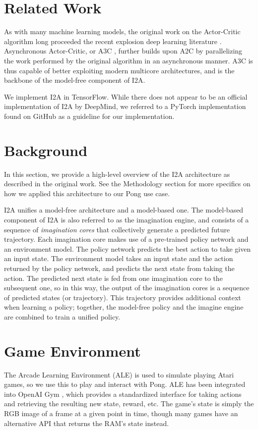 \documentclass[10pt, twocolumn]{article}
\begin{document}
\section{Related Work}
As with many machine learning models, the original work on the Actor-Critic algorithm long proceeded the recent explosion deep learning literature \cite{A2C}. Asynchronous Actor-Critic, or A3C \cite{A3C}, further builds upon A2C by parallelizing the work performed by the original algorithm in an asynchronous manner. A3C is thus capable of better exploiting modern multicore architectures, and is the backbone of the model-free component of I2A.

We implement I2A in TensorFlow. While there does not appear to be an official implementation of I2A by DeepMind, we referred to a PyTorch implementation found on GitHub \cite{} as a guideline for our implementation.

\section{Background}

In this section, we provide a high-level overview of the I2A architecture as described in the original work. See the Methodology section for more specifics on how we applied this architecture to our Pong use case.

I2A unifies a model-free 
architecture and a model-based one. The model-based component of I2A is also referred to as the imagination engine, and consists of a 
sequence of \emph{imagination cores} that collectively generate a predicted future trajectory. Each imagination core makes use of a pre-trained policy network and an environment model. The policy network predicts the best action to take given an input state. The environment model takes an input state and the action returned by the policy network, and predicts the next state from taking the action. The predicted next state is fed from one imagination core to the subsequent one, so in this way, the output of the imagination cores is a sequence of predicted states (or trajectory). This trajectory provides additional context when learning a policy; together, the model-free policy and the imagine engine are combined to train a unified policy.

\section{Game Environment}
The Arcade Learning Environment (ALE) is used to simulate playing Atari games, so we use this to play and interact with
Pong. ALE has been integrated into OpenAI Gym \cite{openai}, which provides a standardized interface for taking actions
and retrieving the resulting new state, reward, etc. The game's state is simply the RGB image of a frame at a given point in time,
though many games have an alternative API that returns the RAM's state instead.
\end{document}
